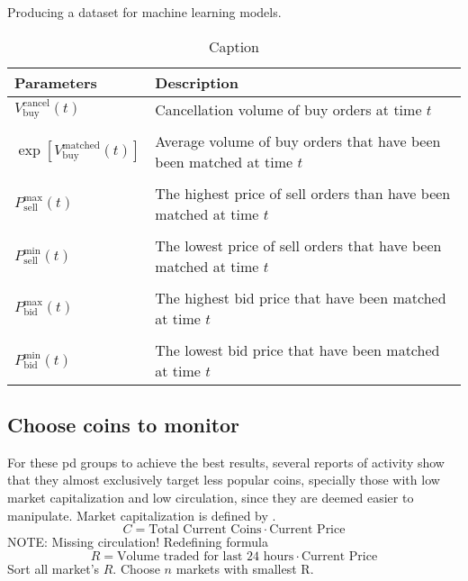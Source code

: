 Producing a dataset for machine learning models\cite{P&D_stock_price_manipulation}.
\begin{table}
    \centering
    \begin{tabular}{p{} p{}}
        \hline
        \textbf{Parameters} & \textbf{Description}\\
        \hline
         $V_{\text{buy}}^{\text{cancel}} (t) $ & Cancellation volume of buy orders at time $t$\\\\
         $\exp{[V_{\text{buy}}^{\text{matched}}(t)]}$ & Average volume of buy orders that have been been matched at time $t$\\\\
         $P_{\text{sell}}^{\text{max}}(t)$ & The highest price of sell orders than have been matched at time $t$\\\\
         $P_{\text{sell}}^{\text{min}}(t)$ & The lowest price of sell orders that have been matched at time $t$\\\\
         $P_{\text{bid}}^{\text{max}}(t)$  & The highest bid price that have been matched at time $t$\\\\
         $P_{\text{bid}}^{\text{min}}(t)$  & The lowest bid price that have been matched at time $t$\\
         \hline
    \end{tabular}
    \caption{Caption}
    \label{tab:my_label}
\end{table}

\subsection{Choose coins to monitor}
For these \ac{pd} groups to achieve the best results, several reports of activity show that they almost exclusively target less popular coins, specially those with low market capitalization and low circulation, since they are deemed easier to manipulate\cite{P&D_avoid_getting_duped, P&D_here_is_how, P&D_how_to_spot}. Market capitalization is defined by \cite{cryptocurrency_market_cap}. 
\begin{equation}
    C = \text{Total Current Coins} \cdot \text{Current Price}
\end{equation}
NOTE:
Missing circulation! Redefining formula
\begin{equation}
    R = \text{Volume traded for last 24 hours} \cdot \text{Current Price}
\end{equation}
Sort all market's $R$. Choose $n$ markets with smallest R.
